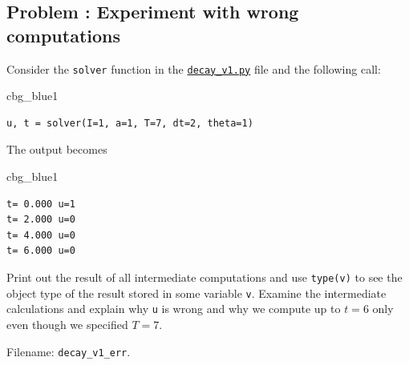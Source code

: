 \documentclass[%
oneside,                 %
final,                   %
10pt]{article}
\newenvironment{_cod_tight}[1]{
   \def\FrameCommand{\colorbox{#1}}
   \FrameRule0.6pt\MakeFramed {\FrameRestore}\vskip3mm}
   {\vskip0mm\endMakeFramed}
\newenvironment{cod}[1]{
\bgroup\rmfamily
\fboxsep=0mm\relax
\begin{_cod_tight}{#1}
\list{}{\parsep=-2mm\parskip=0mm\topsep=0pt\leftmargin=2mm
\rightmargin=2\leftmargin\leftmargin=4pt\relax}
\item\relax}
{\endlist\end{_cod_tight}\egroup}
\newenvironment{doconceexercise}{}{}
\newcounter{doconceexercisecounter}
\begin{document}
\begin{doconceexercise}

\subsection*{Problem \thedoconceexercisecounter: Experiment with wrong computations}

\label{decay:exer:decay1err}

Consider the \texttt{solver} function in the \href{{http://tinyurl.com/ofkw6kc/alg/decay_v1.py}}{\nolinkurl{decay_v1.py}} file
and the following call:

\begin{cod}{cbg_blue1}\begin{Verbatim}[numbers=none,fontsize=\fontsize{9pt}{9pt},baselinestretch=0.95,xleftmargin=2mm]
u, t = solver(I=1, a=1, T=7, dt=2, theta=1)
\end{Verbatim}
\end{cod}
\noindent
The output becomes

\begin{cod}{cbg_blue1}\begin{Verbatim}[numbers=none,fontsize=\fontsize{9pt}{9pt},baselinestretch=0.95,xleftmargin=2mm]
t= 0.000 u=1
t= 2.000 u=0
t= 4.000 u=0
t= 6.000 u=0
\end{Verbatim}
\end{cod}
\noindent
Print out the result of all intermediate computations and use
\texttt{type(v)} to see the object type of the result stored in some variable \texttt{v}.
Examine the intermediate calculations and explain
why \texttt{u} is wrong and why we compute up to $t=6$ only even though we
specified $T=7$.


\noindent Filename: \Verb!decay_v1_err!.

\end{doconceexercise}
\end{document}
